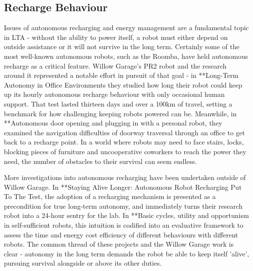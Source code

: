\documentclass{sfuthesis}
\begin{document}
\subsection{Recharge Behaviour}

Issues of autonomous recharging and energy management are a fundamental topic in LTA - without the ability to power itself, a robot must either depend on outside assistance or it will not survive in the long term. Certainly some of the most well-known autonomous robots, such as the Roomba, have held autonomous recharge as a critical feature. Willow Garage's PR2 robot and the research around it represented a notable effort in pursuit of that goal - in **Long-Term Autonomy in Office Environments they studied how long their robot could keep up its hourly autonomous recharge behaviour with only occasional human support. That test lasted thirteen days and over a 100km of travel, setting a benchmark for how challenging keeping robots powered can be. Meanwhile, in **Autonomous door opening and plugging in with a personal robot, they examined the navigation difficulties of doorway traversal through an office to get back to a recharge point. In a world where robots may need to face stairs, locks, blocking pieces of furniture and uncooperative coworkers to reach the power they need, the number of obstacles to their survival can seem endless.

More investigations into autonomous recharging have been undertaken outside of Willow Garage. In **Staying Alive Longer: Autonomous Robot Recharging Put To The Test, the adoption of a recharging mechanism is presented as a precondition for true long-term autonomy, and immediately turns their research robot into a 24-hour sentry for the lab. In **Basic cycles, utility and opportunism in self-sufficient robots, this intuition is codified into an evaluative framework to assess the time and energy cost efficiency of different behaviours with different robots. The common thread of these projects and the Willow Garage work is clear - autonomy in the long term demands the robot be able to keep itself 'alive', pursuing survival alongside or above its other duties. 



\end{document}
